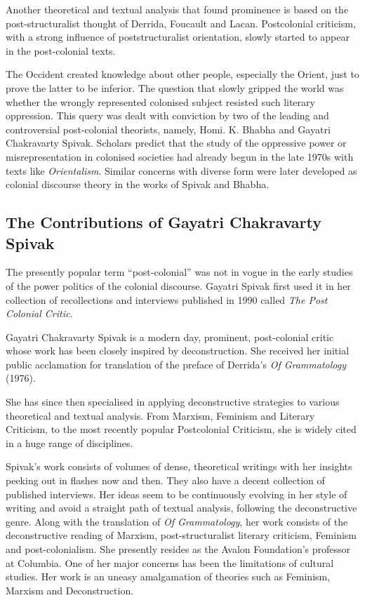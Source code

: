 Another theoretical and textual analysis that found prominence is based on the post-structuralist thought of Derrida, Foucault and Lacan. Postcolonial criticism, with a strong influence of poststructuralist orientation, slowly started to appear in the post-colonial texts.

The Occident created knowledge about other people, especially the Orient, just to prove the latter to be inferior. The question that slowly gripped the world was whether the wrongly represented colonised subject resisted such literary oppression. This query was dealt with conviction by two of the leading and controversial post-colonial theorists, namely, Homi. K. Bhabha and Gayatri Chakravarty Spivak. Scholars predict that the study of the oppressive power or misrepresentation in colonised societies had already begun in the late 1970s with texts like \emph{Orientalism}. Similar concerns with diverse form were later developed as colonial discourse theory in the works of Spivak and Bhabha. 

\subsection{The Contributions of Gayatri Chakravarty Spivak}

The presently popular term ``post-colonial'' was not in vogue in the early studies of the power politics of the colonial discourse. Gayatri Spivak first used it in her collection of recollections and interviews published in 1990 called \emph{The Post Colonial Critic}.

Gayatri Chakravarty Spivak is a modern day, prominent, post-colonial critic whose work has been closely inspired by deconstruction. She received her initial public acclamation for translation of the preface of Derrida’s \emph{Of Grammatology} (1976).

She has since then specialised in applying deconstructive strategies to various theoretical and textual analysis. From Marxism, Feminism and Literary Criticism, to the most recently popular Postcolonial Criticism, she is widely cited in a huge range of disciplines.

Spivak’s work consists of volumes of dense, theoretical writings with her insights peeking out in flashes now and then. They also have a decent collection of published interviews. Her ideas seem to be continuously evolving in her style of writing and avoid a straight path of textual analysis, following the deconstructive genre. Along with the translation of \emph{Of Grammatology}, her work consists of the deconstructive reading of Marxism, post-structuralist literary criticism, Feminism and post-colonialism. She presently resides as the Avalon Foundation’s professor at Columbia. One of her major concerns has been the limitations of cultural studies. Her work is an uneasy amalgamation of theories such as Feminism, Marxism and Deconstruction. 

